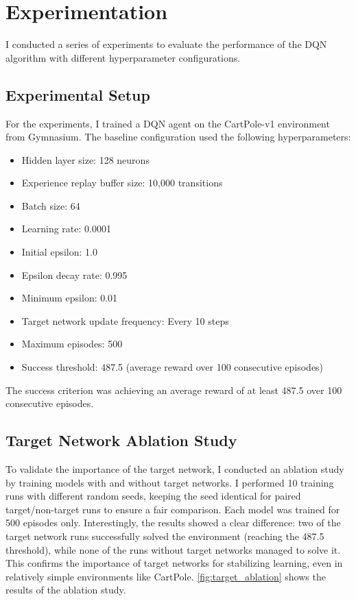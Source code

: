 \documentclass{article}
\begin{document}
\section{Experimentation}
I conducted a series of experiments to evaluate the performance of the DQN algorithm with different hyperparameter configurations.

\subsection{Experimental Setup}
For the experiments, I trained a DQN agent on the CartPole-v1 environment from Gymnasium. The baseline configuration used the following hyperparameters:
\begin{itemize}
    \item Hidden layer size: 128 neurons
    \item Experience replay buffer size: 10,000 transitions
    \item Batch size: 64
    \item Learning rate: 0.0001
    \item Initial epsilon: 1.0
    \item Epsilon decay rate: 0.995
    \item Minimum epsilon: 0.01
    \item Target network update frequency: Every 10 steps
    \item Maximum episodes: 500
    \item Success threshold: 487.5 (average reward over 100 consecutive episodes)
\end{itemize}

The success criterion was achieving an average reward of at least 487.5 over 100 consecutive episodes.

\subsection{Target Network Ablation Study}
To validate the importance of the target network, I conducted an ablation study by training models with and without target networks. I performed 10 training runs with different random seeds, keeping the seed identical for paired target/non-target runs to ensure a fair comparison. Each model was trained for 500 episodes only. Interestingly, the results showed a clear difference: two of the target network runs successfully solved the environment (reaching the 487.5 threshold), while none of the runs without target networks managed to solve it. This confirms the importance of target networks for stabilizing learning, even in relatively simple environments like CartPole. \ref{fig:target_ablation} shows the results of the ablation study.
\end{document}
